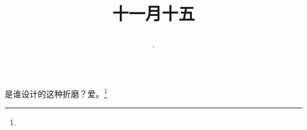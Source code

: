 \title{\date[d=15,m=12,y=2024][year:cn-y,年,month:cn,day:cn,日,·,weekday]·十一月十五 }
是谁设计的这种折磨？爱。\footnote{ }

